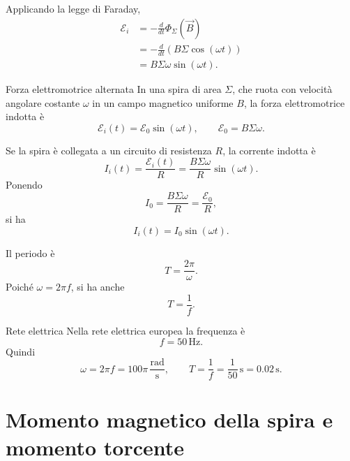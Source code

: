 \documentclass[a4paper]{article}
\begin{document}
Applicando la legge di Faraday,
\begin{align*}
\mathcal{E}_i
&=-\frac{d}{dt}\Phi_\Sigma(\vec{B}) \\
&=-\frac{d}{dt}\left(B\Sigma\cos(\omega t)\right) \\
&=B\Sigma\omega\sin(\omega t).
\end{align*}

\begin{snippetproposition}{Forza elettromotrice alternata}
In una spira di area \(\Sigma\), che ruota con velocità angolare costante \(\omega\) in un campo magnetico uniforme \(B\), la forza elettromotrice indotta è
\[
    \mathcal{E}_i(t)=\mathcal{E}_0\sin(\omega t),
    \qquad
    \mathcal{E}_0=B\Sigma\omega.
\]
\end{snippetproposition}

Se la spira è collegata a un circuito di resistenza \(R\), la corrente indotta è
\[
I_i(t)=\frac{\mathcal{E}_i(t)}{R}
=\frac{B\Sigma\omega}{R}\sin(\omega t).
\]
Ponendo
\[
I_0=\frac{B\Sigma\omega}{R}=\frac{\mathcal{E}_0}{R},
\]
si ha
\[
I_i(t)=I_0\sin(\omega t).
\]

\begin{center}
\end{center}

Il periodo è
\[
T=\frac{2\pi}{\omega}.
\]
Poiché \(\omega=2\pi f\), si ha anche
\[
T=\frac{1}{f}.
\]

\begin{snippetexample}{Rete elettrica}
Nella rete elettrica europea la frequenza è
\[
    f=50\,\mathrm{Hz}.
\]
Quindi
\[
    \omega=2\pi f=100\pi\,\frac{\mathrm{rad}}{\mathrm{s}},
    \qquad
    T=\frac{1}{f}=\frac{1}{50}\,\mathrm{s}=0.02\,\mathrm{s}.
\]
\end{snippetexample}

\section{Momento magnetico della spira e momento torcente}
\end{document}
